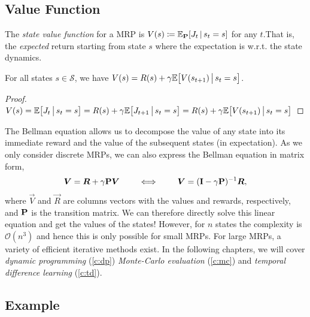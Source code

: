 		\subsection{Value Function}
			\begin{definition}
				The \emph{state value function} for a \ac{MRP} is \( V(s) \coloneqq \mathbb{E}_{\bm{\mathrm{P}}}[J_t \,\vert\, s_t = s] \) for any \(t\).That is, the \emph{expected} return starting from state \(s\) where the expectation is w.r.t. the state dynamics.
			\end{definition}
			\begin{theorem}
				For all states \(s \in \mathcal{S}\), we have \( V(s) = R(s) + \gamma \mathbb{E}\bigl[ V(s_{t + 1}) \,\big\vert\, s_t = s \bigr] \).
			\end{theorem}
			\begin{proof}
				\(
					V(s)
						= \mathbb{E}\bigl[ J_t \,\big\vert\, s_t = s \bigr]
						= R(s) + \gamma \mathbb{E}\bigl[ J_{t + 1} \,\big\vert\, s_t = s \bigr]
						= R(s) + \gamma \mathbb{E}\bigl[ V(s_{t + 1}) \,\big\vert\, s_t = s \bigr]
				\)
			\end{proof}
			The Bellman equation allows us to decompose the value of any state into its immediate reward and the value of the subsequent states (in expectation). As we only consider discrete \acp{MRP}, we can also express the Bellman equation in matrix form,
			\begin{equation}
				\bm{V} = \bm{R} + \gamma \bm{\mathrm{P}} \bm{V}
				\qquad\iff\qquad
				\bm{V} = (\bm{\mathrm{I}} - \gamma \bm{\mathrm{P}})^{-1} \bm{R},
				\label{eq:closedFormBellman}
			\end{equation}
			where \(\vec{V}\) and \(\vec{R}\) are columns vectors with the values and rewards, respectively, and \(\bm{\mathrm{P}}\) is the transition matrix. We can therefore directly solve this linear equation and get the values of the states! However, for \(n\) states the complexity is \(\mathcal{O}(n^3)\) and hence this is only possible for small \acp{MRP}. For large \acp{MRP}, a variety of efficient iterative methods exist. In the following chapters, we will cover \emph{dynamic programming} (\autoref{c:dp}) \emph{Monte-Carlo evaluation} (\autoref{c:mc}) and \emph{temporal difference learning} (\autoref{c:td}).

		\subsection{Example}


